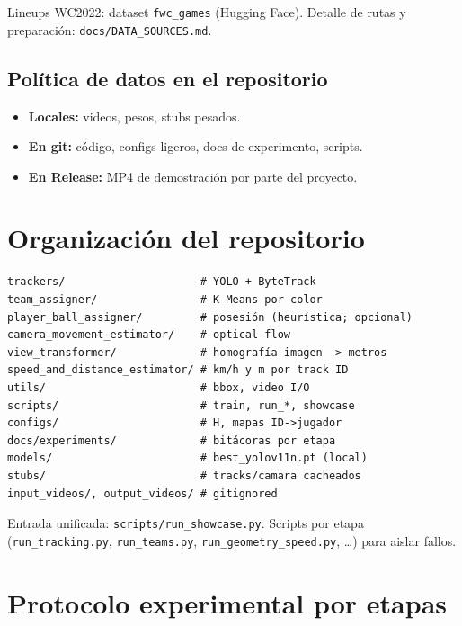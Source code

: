 \documentclass[11pt,a4paper]{article}
\begin{document}
Lineups WC2022: dataset \texttt{fwc\_games} (Hugging Face). Detalle de rutas y preparación: \texttt{docs/DATA\_SOURCES.md}.

\subsection{Política de datos en el repositorio}

\begin{itemize}[leftmargin=*]
  \item \textbf{Locales:} videos, pesos, stubs pesados.
  \item \textbf{En git:} código, configs ligeros, docs de experimento, scripts.
  \item \textbf{En Release:} MP4 de demostración por parte del proyecto.
\end{itemize}

\section{Organización del repositorio}
\label{sec:repo}

\begin{lstlisting}
trackers/                     # YOLO + ByteTrack
team_assigner/                # K-Means por color
player_ball_assigner/         # posesión (heurística; opcional)
camera_movement_estimator/    # optical flow
view_transformer/             # homografía imagen -> metros
speed_and_distance_estimator/ # km/h y m por track ID
utils/                        # bbox, video I/O
scripts/                      # train, run_*, showcase
configs/                      # H, mapas ID->jugador
docs/experiments/             # bitácoras por etapa
models/                       # best_yolov11n.pt (local)
stubs/                        # tracks/camara cacheados
input_videos/, output_videos/ # gitignored
\end{lstlisting}

Entrada unificada: \texttt{scripts/run\_showcase.py}. Scripts por etapa (\texttt{run\_tracking.py}, \texttt{run\_teams.py}, \texttt{run\_geometry\_speed.py}, \ldots) para aislar fallos.

\section{Protocolo experimental por etapas}
\label{sec:protocolo}
\end{document}
